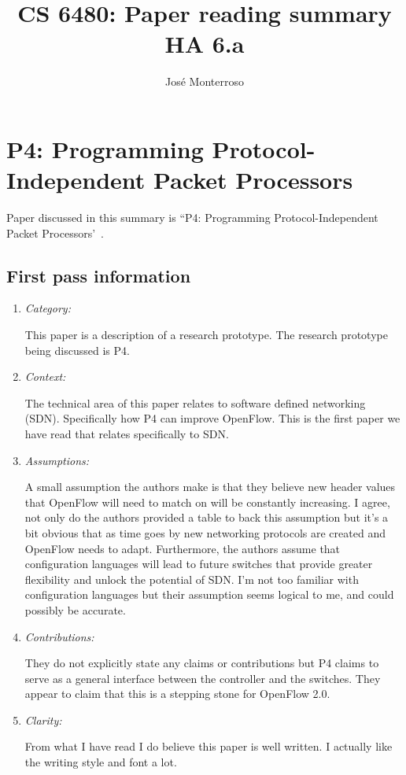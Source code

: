 \documentclass[letterpaper,twocolumn,10pt]{article}
\title{CS 6480: Paper reading summary\\
HA 6.a\\}
\author{José Monterroso}
\affil{School of Computing, University of Utah}
\begin{document}
\maketitle
\section{ P4: Programming Protocol-Independent Packet Processors }

Paper discussed in this summary is ``P4: Programming Protocol-Independent Packet Processors'~\cite{p4}.

\subsection{First pass information}
\label{sec:first}

\begin{enumerate}

\item {\it Category:} 

This paper is a description of a research prototype. The research prototype being discussed is P4.

\item {\it Context:} 

The technical area of this paper relates to software defined networking (SDN). Specifically how P4 can improve
OpenFlow. This is the first paper we have read that relates specifically to SDN. 

\item {\it Assumptions:}  

A small assumption the authors make is that they believe new header values that OpenFlow will need to match on
will be constantly increasing. I agree, not only do the authors provided a table to back this assumption but it's a bit 
obvious that as time goes by new networking protocols are created and OpenFlow needs to adapt. Furthermore, the
authors assume that configuration languages will lead to future switches that provide greater flexibility and unlock
the potential of SDN. I'm not too familiar with configuration languages but their assumption seems logical to me, 
and could possibly be accurate.  

\item {\it Contributions:} 

They do not explicitly state any claims or contributions but P4 claims to serve as a general interface between the 
controller and the switches. They appear to claim that this is a stepping stone for OpenFlow 2.0.

\item {\it Clarity:} 

From what I have read I do believe this paper is well written. I actually like the writing style and font a lot. 

\end{enumerate}
\end{document}
